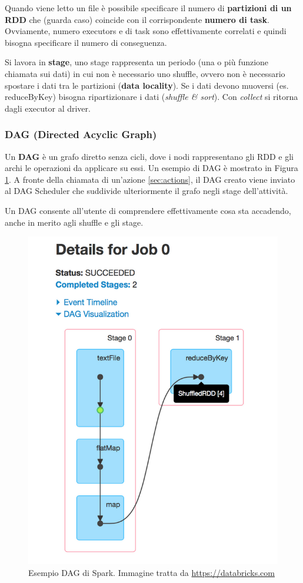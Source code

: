 \documentclass[12pt,italian]{article}
\begin{document}
Quando viene letto un file è possibile specificare il numero di \textbf{partizioni di un RDD} che (guarda caso) coincide con il corrispondente \textbf{numero di task}.
Ovviamente, numero executors e di task sono effettivamente correlati e quindi bisogna specificare il numero di conseguenza.

Si lavora in \textbf{stage}, uno stage rappresenta un periodo (una o più funzione chiamata sui dati) in cui non è necessario uno shuffle, ovvero non è necessario spostare i dati tra le partizioni (\textbf{data locality}). Se i dati devono muoversi (es. reduceByKey) bisogna ripartizionare i dati (\textit{shuffle \& sort}).
Con \textit{collect} si ritorna dagli executor al driver.

\subsubsection{DAG (Directed Acyclic Graph) }\label{sec:DAG}
Un \textbf{DAG} è un grafo diretto senza cicli, dove i nodi rappresentano gli RDD e gli archi le operazioni da applicare su essi. Un esempio di DAG è mostrato in Figura \ref{fig:DAG}.
A fronte della chiamata di un'azione \ref{sec:actions}, il DAG creato viene inviato al DAG Scheduler che suddivide ulteriormente il grafo negli stage dell'attività.
\par Un DAG consente all'utente di comprendere effettivamente cosa sta accadendo, anche in merito agli shuffle e gli stage.
\begin{figure}[H]
	\centering 
	\includegraphics[width=0.6\linewidth]{img/DAG.png}
	\caption{Esempio DAG di Spark. Immagine tratta da \url{https://databricks.com}}
	\label{fig:DAG}
\end{figure}
\end{document}
